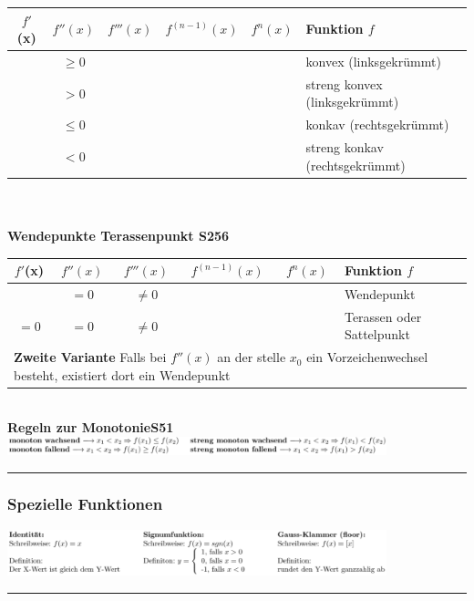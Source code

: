 \documentclass[6pt,a4paper]{scrartcl}
\begin{document}
\begin{multicols*}{2}
\begin{tabular}{|c|c|c|c|c|l|}
	\hline
	$f'$(x) & $f''(x)$ & $f'''(x)$ & $f^{(n-1)}(x)$ & $f^{n}(x)$ & Funktion $f$\\
	\hline
	& $\geq0$ &&&& konvex (linksgekrümmt)\\
	\hline
	& $>0$ &&&& streng konvex (linksgekrümmt)\\
	\hline
	& $\leq0$ &&&& konkav (rechtsgekrümmt)\\
	\hline
	& $<0$ &&&& streng konkav (rechtsgekrümmt)\\
	\hline
\end{tabular}
\\
\\
\textbf{Wendepunkte Terassenpunkt \color{red}S256}

\begin{tabular}{|c|c|c|c|c|l|}
	\hline
	$f'$(x) & $f''(x)$ & $f'''(x)$ & $f^{(n-1)}(x)$ & $f^{n}(x)$ & Funktion $f$\\
	\hline
	& $=0$ & $\neq0$ &&& Wendepunkt\\
	\hline
	$=0$ & $=0$ & $\neq0$ &&& Terassen oder Sattelpunkt\\
	\hline
	\multicolumn{6}{|l|}{\textbf{Zweite Variante} Falls bei $f''(x)$ an der stelle $x_{0}$ ein Vorzeichenwechsel besteht, existiert dort ein Wendepunkt}\\
	\hline
	
\end{tabular}
\\ \newpage
\textbf{Regeln zur Monotonie\color{red}S51}\\
\includegraphics[width=11cm]{Monotonie.PNG}\\
\hrule
\subsubsection{Spezielle Funktionen}
\includegraphics[width=11cm]{SpezFunkt.PNG}\\
\hrule

\end{multicols*}
\end{document}

